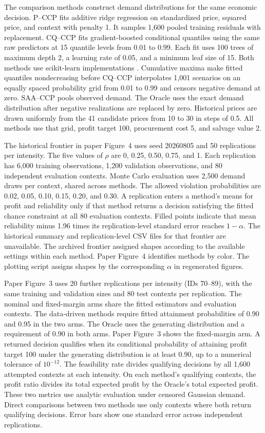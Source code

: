 The comparison methods construct demand distributions for the same economic decision. P--CCP fits additive ridge regression on standardized price, squared price, and context with penalty 1. It samples 1,600 pooled training residuals with replacement. CQ--CCP fits gradient-boosted conditional quantiles using the same raw predictors at 15 quantile levels from 0.01 to 0.99. Each fit uses 100 trees of maximum depth 2, a learning rate of 0.05, and a minimum leaf size of 15. Both methods use scikit-learn implementations \citep{pedregosa2011scikit}. Cumulative maxima make fitted quantiles nondecreasing before CQ--CCP interpolates 1,001 scenarios on an equally spaced probability grid from 0.01 to 0.99 and censors negative demand at zero. SAA--CCP pools observed demand. The Oracle uses the exact demand distribution after negative realizations are replaced by zero. Historical prices are drawn uniformly from the 41 candidate prices from 10 to 30 in steps of 0.5. All methods use that grid, profit target 100, procurement cost 5, and salvage value 2.

The historical frontier in paper Figure~4 uses seed 20260805 and 50 replications per intensity. The five values of \(\rho\) are 0, 0.25, 0.50, 0.75, and 1. Each replication has 6,000 training observations, 1,200 validation observations, and 80 independent evaluation contexts. Monte Carlo evaluation uses 2,500 demand draws per context, shared across methods. The allowed violation probabilities are 0.02, 0.05, 0.10, 0.15, 0.20, and 0.30. A replication enters a method's means for profit and reliability only if that method returns a decision satisfying the fitted chance constraint at all 80 evaluation contexts. Filled points indicate that mean reliability minus 1.96 times its replication-level standard error reaches \(1-\alpha\). The historical summary and replication-level CSV files for that frontier are unavailable. The archived frontier assigned shapes according to the available settings within each method. Paper Figure~4 identifies methods by color. The plotting script assigns shapes by the corresponding \(\alpha\) in regenerated figures.

Paper Figure~3 uses 20 further replications per intensity (IDs 70--89), with the same training and validation sizes and 80 test contexts per replication. The nominal and fixed-margin arms share the fitted estimators and evaluation contexts. The data-driven methods require fitted attainment probabilities of 0.90 and 0.95 in the two arms. The Oracle uses the generating distribution and a requirement of 0.90 in both arms. Paper Figure~3 shows the fixed-margin arm. A returned decision qualifies when its conditional probability of attaining profit target 100 under the generating distribution is at least 0.90, up to a numerical tolerance of \(10^{-12}\). The feasibility rate divides qualifying decisions by all 1,600 attempted contexts at each intensity. On each method's qualifying contexts, the profit ratio divides its total expected profit by the Oracle's total expected profit. These two metrics use analytic evaluation under censored Gaussian demand. Direct comparisons between two methods use only contexts where both return qualifying decisions. Error bars show one standard error across independent replications.


